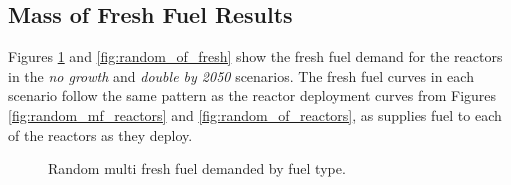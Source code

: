 \subsection{Mass of Fresh Fuel Results}
\label{sec:random_fresh}

Figures \ref{fig:random_mf_fresh} and \ref{fig:random_of_fresh} show the fresh fuel demand for the reactors in the \textit{no growth} and \textit{double by 2050} scenarios. The fresh fuel curves in each scenario follow the same pattern as the reactor deployment curves from Figures \ref{fig:random_mf_reactors} and \ref{fig:random_of_reactors}, as \cyclus supplies fuel to each of the reactors as they deploy.


\begin{figure}[H]
    \hfill
    \caption{Random multi fresh fuel demanded by fuel type.}
    \label{fig:random_mf_fresh}
  \end{figure}




